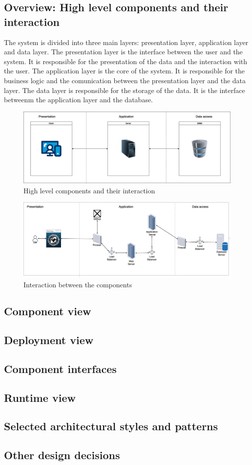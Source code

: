 \subsection{Overview: High level components and their interaction}
The system is divided into three main layers: presentation layer, application layer and data layer. The presentation layer is the interface between the user and the system. It is responsible for the presentation of the data and the interaction with the user. The application layer is the core of the system. It is responsible for the business logic and the comunication between the presentation layer and the data layer. The data layer is responsible for the storage of the data. It is the interface betweenm the application layer and the database.
\begin{figure}[H]
    \centering
    \includegraphics[width=\textwidth]{Images/three_tier.png}
    \caption{High level components and their interaction}
\end{figure}

\begin{figure}[H]
    \centering
    \includegraphics[width=\textwidth]{Images/high_level.png}
    \caption{Interaction between the components}
\end{figure}


\subsection{Component view}
\subsection{Deployment view}
\subsection{Component interfaces}
\subsection{Runtime view}
\subsection{Selected architectural styles and patterns}
\subsection{Other design decisions}
